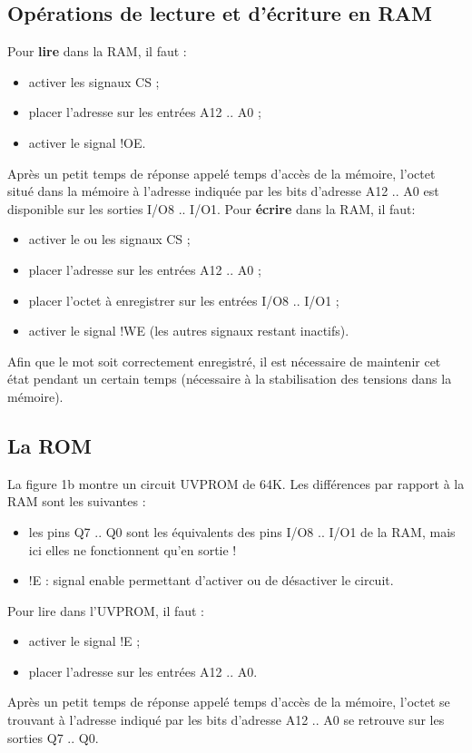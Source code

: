 \subsection*{Opérations de lecture et d’écriture en RAM}
Pour \textbf{lire} dans la RAM, il faut :
\begin{itemize}
\item activer les signaux CS ;
\item placer l’adresse sur les entrées A12 .. A0 ;
\item activer le signal !OE.
\end{itemize}
Après un petit temps de réponse appelé temps d’accès de la mémoire, l’octet situé dans la mémoire à l’adresse indiquée par les bits d’adresse A12 .. A0 est disponible sur les sorties I/O8 .. I/O1.
Pour \textbf{écrire} dans la RAM, il faut:
\begin{itemize}
\item activer le ou les signaux CS ;
\item placer l’adresse sur les entrées A12 .. A0 ;
\item placer l’octet à enregistrer sur les entrées I/O8 .. I/O1 ;
\item activer le signal !WE (les autres signaux restant inactifs).
\end{itemize}
Afin que le mot soit correctement enregistré, il est nécessaire de maintenir cet état pendant un certain temps (nécessaire à la stabilisation des tensions dans la mémoire).

\subsection*{La ROM}
La figure 1b montre un circuit UVPROM de 64K. Les différences par rapport à la RAM sont les suivantes :\\
\begin{itemize}
\item les pins Q7 .. Q0 sont les équivalents des pins I/O8 .. I/O1 de la RAM, mais ici elles ne fonctionnent qu’en sortie !
\item !E : signal enable permettant d’activer ou de désactiver le circuit.
\end{itemize}

Pour lire dans l’UVPROM, il faut :
\begin{itemize}
\item activer le signal !E ;
\item placer l’adresse sur les entrées A12 .. A0.
\end{itemize}
Après un petit temps de réponse appelé temps d’accès de la mémoire, l’octet se trouvant à l’adresse indiqué par les bits d’adresse A12 .. A0 se retrouve sur les sorties Q7 .. Q0.


